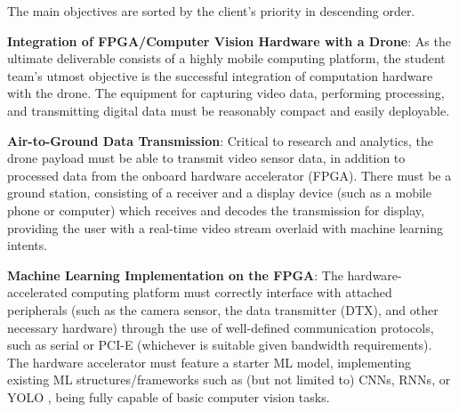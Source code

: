 The main objectives are sorted by the client's priority in descending order.

\textbf{Integration of FPGA/Computer Vision Hardware with a Drone}:
As the ultimate deliverable consists of a highly mobile computing platform,
the student team's utmost objective is the successful integration of computation hardware with the drone.
The equipment for capturing video data, performing processing, and transmitting digital data must be reasonably compact and easily deployable.

\textbf{Air-to-Ground Data Transmission}:
Critical to research and analytics, the drone payload must be able to transmit video sensor data, in addition to processed data
from the onboard hardware accelerator (FPGA). There must be a ground station, consisting of a receiver and a display device (such as a mobile phone or 
computer) which receives and decodes the transmission for display, providing the user with a real-time video stream overlaid with machine learning intents.


\textbf{Machine Learning Implementation on the FPGA}:
The hardware-accelerated computing platform must correctly interface with attached peripherals (such as the camera sensor, the data transmitter (DTX), and other necessary hardware) through the use of well-defined communication protocols, such as serial or PCI-E (whichever is suitable given bandwidth requirements). The hardware accelerator must feature a starter ML model, implementing existing ML structures/frameworks such as (but not limited to) CNNs, RNNs, or YOLO \cite{yolo}, being fully capable of basic computer vision tasks.
